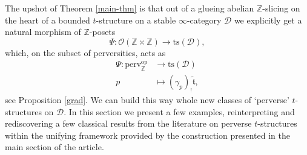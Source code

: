 \documentclass{article}
\newtheorem{lem}[thm]{Lemma}
\theoremstyle{definition}
\newcommand{\Z}{\mathbb{Z}}
\newcommand{\Oo}{\mathcal{O}}
\newcommand{\ts}{\mathrm{ts}}
\newcommand{\tee}{\mathfrak{t}}
\newcommand{\lex}{\times_{\textnormal{lex}}}
\newcommand{\triv}{\mathbb{Z}_{\textnormal{tri}}}
\begin{document}
%
%
 


The  upshot of Theorem \ref{main-thm} is that out of a glueing abelian $\Z$-slicing on the heart of a bounded $t$-structure on a stable $\infty$-category $\mathscr{D}$
we explicitly get a natural morphism of $\Z$-posets
\[
\Psi\colon\Oo(\Z\times\Z)\to \ts(\mathscr{D}),
\]
which, on the subset of perversities, acts as
\begin{align*}
\Psi\colon \mathrm{perv}_\Z^{\mathrm{op}}&\to \ts(\mathscr{D})\\
p&\mapsto (\gamma_p)_!\tilde{\tee},
\end{align*}
see Proposition \ref{grad}. We can build this way whole new classes of `perverse' $t$-structures on $\mathscr{D}$. In this section we present a few examples, reinterpreting and rediscovering a few classical results from the literature on perverse $t$-structures within the unifying framework provided by the construction presented in the main section of the article.
\end{document}
